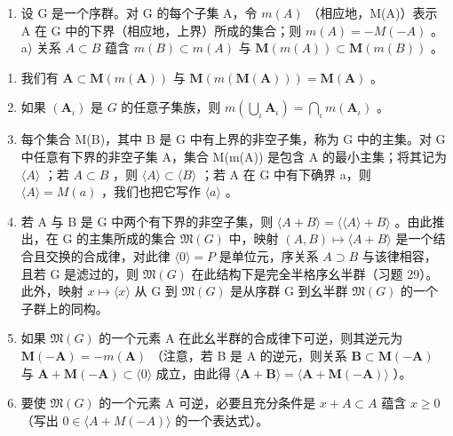 \begin{enumerate}
\def\labelenumi{\arabic{enumi})}
\setcounter{enumi}{29}
\tightlist
\item
  设 G 是一个序群。对 G 的每个子集 A，令 \(m(A)\) （相应地，M(A)）表示 A 在 G 中的下界（相应地，上界）所成的集合；则 \(m(A) = -M(-A)\) 。a) 关系 \(A \subset B\) 蕴含 \(m(B) \subset m(A)\) 与 \(\mathbf{M}(m(A)) \subset \mathbf{M}(m(B))\) 。
\end{enumerate}

\begin{enumerate}
\def\labelenumi{\alph{enumi})}
\setcounter{enumi}{1}
\item
  我们有 \(\mathbf{A} \subset \mathbf{M}(m(\mathbf{A}))\) 与 \(\mathbf{M}(m(\mathbf{M}(\mathbf{A}))) = \mathbf{M}(\mathbf{A})\) 。
\item
  如果 \((\mathbf{A}_{\iota})\) 是 \(G\) 的任意子集族，则 \(m\left(\bigcup_{\iota} \mathbf{A}_{\iota}\right) = \bigcap_{\iota} m(\mathbf{A}_{\iota})\) 。
\item
  每个集合 M(B)，其中 B 是 G 中有上界的非空子集，称为 G 中的主集。对 G 中任意有下界的非空子集 A，集合 M(m(A)) 是包含 A 的最小主集；将其记为 \(\langle A\rangle\) ；若 \(A\subset B\) ，则 \(\langle A\rangle\subset\langle B\rangle\) ；若 A 在 G 中有下确界 a，则 \(\langle A\rangle=M(a)\) ，我们也把它写作 \(\langle a\rangle\) 。
\item
  若 A 与 B 是 G 中两个有下界的非空子集，则 \(\langle A + B \rangle = \langle \langle A \rangle + B \rangle\) 。由此推出，在 G 的主集所成的集合 \(\mathfrak{M}(G)\) 中，映射 \((A, B) \mapsto \langle A + B \rangle\) 是一个结合且交换的合成律，对此律 \(\langle 0 \rangle = P\) 是单位元，序关系 \(A \supset B\) 与该律相容，且若 G 是滤过的，则 \(\mathfrak{M}(G)\) 在此结构下是完全半格序幺半群（习题 29）。此外，映射 \(x \mapsto \langle x \rangle\) 从 G 到 \(\mathfrak{M}(G)\) 是从序群 G 到幺半群 \(\mathfrak{M}(G)\) 的一个子群上的同构。
\item
  如果 \(\mathfrak{M}(G)\) 的一个元素 A 在此幺半群的合成律下可逆，则其逆元为 \(\mathbf{M}(-\mathbf{A}) = -m(\mathbf{A})\) （注意，若 B 是 A 的逆元，则关系 \(\mathbf{B} \subset \mathbf{M}(-\mathbf{A})\) 与 \(\mathbf{A} + \mathbf{M}(-\mathbf{A}) \subset \langle 0 \rangle\) 成立，由此得 \(\langle \mathbf{A} + \mathbf{B} \rangle = \langle \mathbf{A} + \mathbf{M}(-\mathbf{A}) \rangle\) ）。
\item
  要使 \(\mathfrak{M}(G)\) 的一个元素 A 可逆，必要且充分条件是 \(x + A \subset A\) 蕴含 \(x \geqslant 0\) （写出 \(0 \in \langle A + M(-A) \rangle\) 的一个表达式）。
\end{enumerate}

